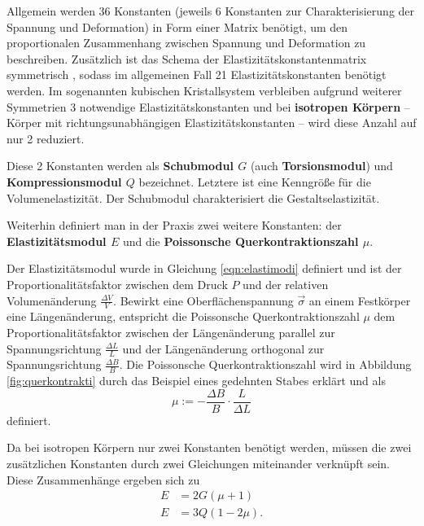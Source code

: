 Allgemein werden 36 Konstanten (jeweils 6 Konstanten zur Charakterisierung der Spannung und
Deformation) in Form einer Matrix benötigt, um den proportionalen Zusammenhang zwischen
Spannung und Deformation zu beschreiben.
Zusätzlich ist das Schema der Elastizitätskonstantenmatrix symmetrisch \cite{Ergebnis der 
exakten Naturwissenschaften vierter band , googlen 21 elastsoooss}, sodass im allgemeinen Fall 
21 Elastizitätskonstanten benötigt werden.
Im sogenannten kubischen Kristallsystem verbleiben aufgrund weiterer Symmetrien 3 notwendige 
Elastizitätskonstanten und bei \textbf{isotropen Körpern} -- Körper mit richtungsunabhängigen 
Elastizitätskonstanten -- wird diese Anzahl auf nur 2 reduziert.

Diese 2 Konstanten werden als \textbf{Schubmodul $G$} (auch \textbf{Torsionsmodul}) und 
\textbf{Kompressionsmodul $Q$} bezeichnet.
Letztere ist eine Kenngröße für die Volumenelastizität. Der Schubmodul charakterisiert die 
Gestaltselastizität.

Weiterhin definiert man in der Praxis zwei weitere Konstanten: der
\textbf{Elastizitätsmodul $E$} und die \textbf{Poissonsche Querkontraktionszahl $\mu$}.

Der Elastizitätsmodul wurde in Gleichung \eqref{eqn:elastimodi} definiert und ist der 
Proportionalitätsfaktor zwischen dem Druck $P$ und der relativen Volumenänderung
$\frac{\Delta V}{V}$.
Bewirkt eine Oberflächenspannung $\vec{\sigma}$ an einem Festkörper eine Längenänderung, 
entspricht die Poissonsche Querkontraktionszahl $\mu$ dem Proportionalitätsfaktor zwischen 
der Längenänderung parallel zur Spannungsrichtung $\frac{\Delta L}{L}$ und der Längenänderung
orthogonal zur Spannungsrichtung $\frac{\Delta B}{B}$. Die Poissonsche Querkontraktionszahl
wird in Abbildung \ref{fig:querkontrakti} durch das Beispiel eines gedehnten Stabes erklärt und
als
\begin{equation*}
	\mu := - \frac{\Delta B}{B} \cdot \frac{L}{\Delta L}
\end{equation*}
definiert.

Da bei isotropen Körpern nur zwei Konstanten benötigt werden, müssen die zwei zusätzlichen
Konstanten durch zwei Gleichungen miteinander verknüpft sein.
Diese Zusammenhänge ergeben sich zu 
\begin{align}
	E &= 2G (\mu + 1) \\
	E &= 3Q (1 - 2\mu) \mathrm{.}
\end{align}
\FloatBarrier

